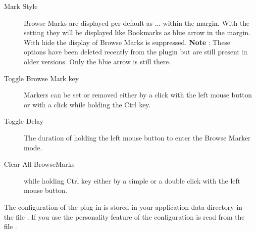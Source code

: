 \begin{description}
\item[Mark Style] Browse Marks are displayed per default as $\ldots$ within the margin. With the setting  they will be displayed like Bookmarks as blue arrow in the margin. With hide the display of Browse Marks is suppressed. \textbf{Note} : These options have been deleted recently from the plugin but are still present in older \codeblocks versions. Only the blue arrow is still there.
\item[Toggle Browse Mark key] Markers can be set or removed either by a click with the left mouse button or with a click while holding the Ctrl key.
\item[Toggle Delay] The duration of holding the left mouse button to enter the Browse Marker mode.
\item[Clear All BrowseMarks] while holding Ctrl key either by a simple or a double click with the left mouse button.
\end{description}

The configuration of the plug-in is stored in your application data directory in the file . If you use the personality feature of \codeblocks the configuration is read from the file .






